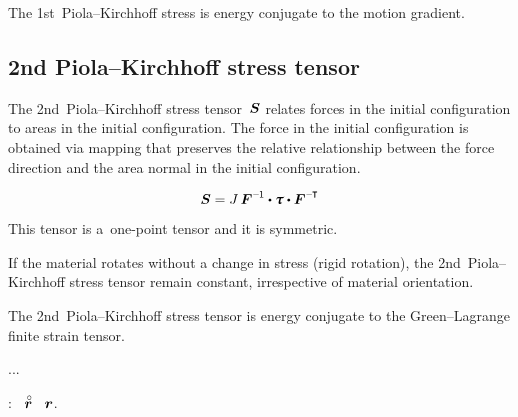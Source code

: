 The 1st~Piola\hbox{--}Kirchhoff stress is energy conjugate to the motion gradient.

\subsection*{2nd Piola\hbox{--}Kirchhoff stress tensor}

The 2nd~Piola\hbox{--}Kirchhoff stress tensor~$\bm{S}$ relates forces in the initial configuration to areas in the initial configuration.
The force in the initial configuration is obtained via mapping that preserves the relative relationship between the force direction and the area normal in the initial configuration.

\noindent\vspace{-0.2em}\begin{equation*}
\secondpiolakirchhoffstress = J \, \bm{F}^{\expminusone} \dotp \cauchystress \dotp \bm{F}^{\expminusT}
\end{equation*}

This tensor is a~one\hbox{-}point tensor and it is symmetric.

If the material rotates without a change in stress (rigid rotation), the 2nd~Piola\hbox{--}Kirchhoff stress tensor remain constant, irrespective of material orientation.

The 2nd~Piola\hbox{--}Kirchhoff stress tensor is energy conjugate to the Green\hbox{--}Lagrange finite strain tensor.

...

\newpage



\label{section:variationofconfiguration}

  :  ~$\initiallocationvector$   ~$\bm{r}$.

